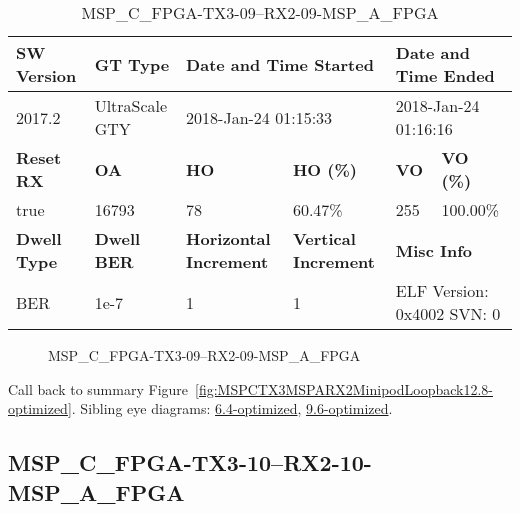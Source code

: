\begin{table}[h]
\centering
\caption{MSP\_C\_FPGA-TX3-09--RX2-09-MSP\_A\_FPGA}
\label{tab:MSPCFPGATX309RX209MSPAFPGA12.8-optimized}
\begin{tabular}{@{}|l|l|l|l|l|l|@{}}
\toprule
\textbf{SW Version}                & \textbf{GT Type}   & \multicolumn{2}{l|}{\textbf{Date and Time Started}}            & \multicolumn{2}{l|}{\textbf{Date and Time Ended}}        \\ \midrule
2017.2                       & UltraScale GTY          & \multicolumn{2}{l|}{2018-Jan-24 01:15:33}                   & \multicolumn{2}{l|}{2018-Jan-24 01:16:16}               \\ \midrule
\textbf{Reset RX}                  & \textbf{OA} & \textbf{HO}   & \textbf{HO (\%)} & \textbf{VO} & \textbf{VO (\%)} \\ \midrule
true & 16793        & 78          & 60.47\%        & 255        & 100.00\%       \\ \midrule
\textbf{Dwell Type}                & \textbf{Dwell BER} & \textbf{Horizontal Increment} & \textbf{Vertical Increment}    & \multicolumn{2}{l|}{\textbf{Misc Info}}                  \\ \midrule
BER                            & 1e-7        & 1        & 1           & \multicolumn{2}{l|}{ELF Version: 0x4002 SVN: 0}                         \\ \bottomrule
\end{tabular}
\end{table}

\begin{figure}[h]
\caption{MSP\_C\_FPGA-TX3-09--RX2-09-MSP\_A\_FPGA} \label{fig:MSPCFPGATX309RX209MSPAFPGA12.8-optimized}
\end{figure}

Call back to summary Figure~\ref{fig:MSPCTX3MSPARX2MinipodLoopback12.8-optimized}.
Sibling eye diagrams: \hyperref[sec:MSPCFPGATX309RX209MSPAFPGA6.4-optimized]{6.4-optimized}, \hyperref[sec:MSPCFPGATX309RX209MSPAFPGA9.6-optimized]{9.6-optimized}.

\clearpage
\newpage


\subsection{MSP\_C\_FPGA-TX3-10--RX2-10-MSP\_A\_FPGA}\label{sec:MSPCFPGATX310RX210MSPAFPGA12.8-optimized}

